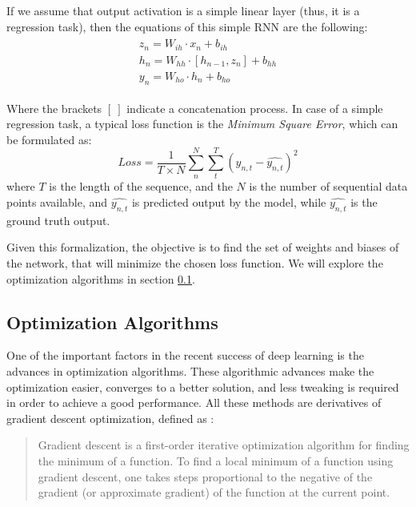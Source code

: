\par If we assume that output activation is a simple linear layer (thus, it is a regression task), then the equations of this simple RNN are the following:
\begin{align}
    \begin{split}
    z_n = W_{ih} \cdot x_{n} + b_{ih}
    \\
    h_n = W_{hh} \cdot [h_{n-1}, z_{n}] + b_{hh}
    \\
    y_n = W_{ho} \cdot h_{n} + b_{ho}
    \label{eq:rnn_equations}
    \end{split}
\end{align}

\par Where the brackets $[\ ]$ indicate a concatenation process. In case of a simple regression task, a typical loss function is the \textit{Minimum Square Error}, which can be formulated as:
\begin{equation}
    Loss = \frac{1}{T \times N} \sum_{n}^{N} \sum_{t}^{T} \left ( y_{n, t} - \hat{y_{n, t}}\right )^2
    \label{eq:loss_fn_mse}
\end{equation}
where $T$ is the length of the sequence, and the $N$ is the number of sequential data points available, and $\hat{y_{n, t}}$ is predicted output by the model, while $\hat{y_{n, t}}$ is the ground truth output.

\par Given this formalization, the objective is to find the set of weights and biases of the network, that will minimize the chosen loss function. We will explore the optimization algorithms in section \ref{subsec:optimization}.

\subsection{Optimization Algorithms} \label{subsec:optimization}
\par One of the important factors in the recent success of deep learning is the advances in optimization algorithms. These algorithmic advances make the optimization easier, converges to a better solution, and less tweaking is required in order to achieve a good performance. All these methods are derivatives of gradient descent optimization, defined as \citep{gradientdescent}:

\begin{quote}
    Gradient descent is a first-order iterative optimization algorithm for finding the minimum of a function. To find a local minimum of a function using gradient descent, one takes steps proportional to the negative of the gradient (or approximate gradient) of the function at the current point.
\end{quote}


